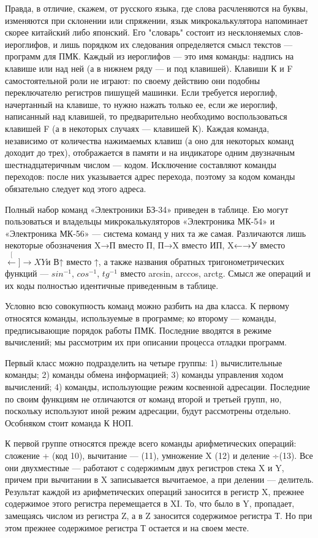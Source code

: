\documentclass[11pt,a4paper,oneside]{article}
\def\XY{$\stackrel[\leftarrow]{\rightarrow}{XY}$}
\begin{document}
Правда, в отличие, скажем, от русского языка, где слова расчленяются на буквы, изменяются при склонении или спряжении, язык микрокалькулятора напоминает скорее китайский либо японский. Его "словарь" состоит из несклоняемых слов-иероглифов, и лишь порядком их следования определяется смысл текстов — программ для ПМК. Каждый из иероглифов — это имя команды: надпись на клавише или над ней (а в нижнем ряду — и под клавишей). Клавиши К и F самостоятельной роли не играют: по своему действию они подобны переключателю регистров пишущей машинки. Если требуется иероглиф, начертанный на клавише, то нужно нажать только ее, если же иероглиф, написанный над клавишей, то предварительно необходимо воспользоваться клавишей F (а в некоторых случаях — клавишей К). Каждая команда, независимо от количества нажимаемых клавиш (а оно для некоторых команд доходит до трех), отображается в памяти и на индикаторе одним двузначным шестнадцатеричным числом — кодом. Исключение составляют команды переходов: после них указывается адрес перехода, поэтому за кодом команды обязательно следует код этого адреса.

Полный набор команд «Электроники БЗ-34» приведен в таблице. Ею могут пользоваться и владельцы микрокалькуляторов «Электроника МК-54» и «Электроника МК-56» — система команд у них та же самая. Различаются лишь некоторые обозначения X→П вместо П, П→X вместо ИП, X←→У вместо \XY и В↑ вместо ↑, а также названия обратных тригонометрических функций — $sin^{-1}$, $cos^{-1}$, $tg^{-1}$ вместо arcsin, arccos, arctg. Смысл же операций и их коды полностью идентичные приведенным в таблице.

Условно всю совокупность команд можно разбить на два класса. К первому относятся команды, используемые в программе; ко второму — команды, предписывающие порядок работы ПМК. Последние вводятся в режиме вычислений; мы рассмотрим их при описании процесса отладки программ.

Первый класс можно подразделить на четыре группы: 1) вычислительные команды; 2) команды обмена информацией; 3) команды управления ходом вычислений; 4) команды, использующие режим косвенной адресации. Последние по своим функциям не отличаются от команд второй и третьей групп, но, поскольку используют иной режим адресации, будут рассмотрены отдельно. Особняком стоит команда К НОП.

К первой группе относятся прежде всего команды арифметических операций: сложение + (код 10), вычитание — (11), умножение X (12) и деление ÷(13). Все они двухместные — работают с содержимым двух регистров стека X и Y, причем при вычитании в X записывается вычитаемое, а при делении — делитель. Результат каждой из арифметических операций заносится в регистр X, прежнее содержимое этого регистра перемещается в XI. То, что было в Y, пропадает, замещаясь числом из регистра Z, а в Z заносится содержимое регистра Т. Но при этом прежнее содержимое регистра Т остается и на своем месте.
\end{document}
